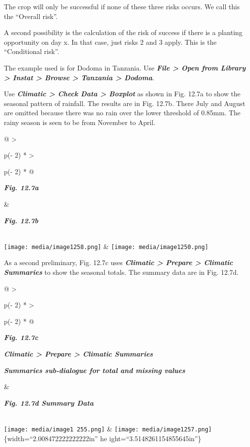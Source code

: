 \documentclass[
  letterpaper,
  DIV=11,
  numbers=noendperiod]{scrreprt}
\begin{document}
The crop will only be successful if none of these three risks occurs. We
call this the ``Overall risk''.

A second possibility is the calculation of the risk of success if there
is a planting opportunity on day x. In that case, just risks 2 and 3
apply. This is the ``Conditional risk''.

The example used is for Dodoma in Tanzania. Use \textbf{\emph{File
\textgreater{} Open from Library \textgreater{} Instat \textgreater{}
Browse \textgreater{} Tanzania \textgreater{} Dodoma}}.

Use \textbf{\emph{Climatic \textgreater{} Check Data \textgreater{}
Boxplot}} as shown in Fig. 12.7a to show the seasonal pattern of
rainfall. The results are in Fig. 12.7b. There July and August are
omitted because there was no rain over the lower threshold of 0.85mm.
The rainy season is seen to be from November to April.

\begin{longtable}[]{@{}
  >{\raggedright\arraybackslash}p{(\columnwidth - 2\tabcolsep) * }
  >{\raggedright\arraybackslash}p{(\columnwidth - 2\tabcolsep) * }@{}}
\toprule\noalign{}
\begin{minipage}[b]{\linewidth}\raggedright
\textbf{\emph{Fig. 12.7a}}
\end{minipage} & \begin{minipage}[b]{\linewidth}\raggedright
\textbf{\emph{Fig. 12.7b}}
\end{minipage} \\
\midrule\noalign{}
\endhead
\bottomrule\noalign{}
\endlastfoot
\texttt{[image: media/image1258.png]} &
\texttt{[image: media/image1250.png]} \\
\end{longtable}

As a second preliminary, Fig. 12.7c uses \textbf{\emph{Climatic
\textgreater{} Prepare \textgreater{} Climatic Summaries}} to show the
seasonal totals. The summary data are in Fig. 12.7d.

\begin{longtable}[]{@{}
  >{\raggedright\arraybackslash}p{(\columnwidth - 2\tabcolsep) * }
  >{\raggedright\arraybackslash}p{(\columnwidth - 2\tabcolsep) * }@{}}
\toprule\noalign{}
\begin{minipage}[b]{\linewidth}\raggedright
\textbf{\emph{Fig. 12.7c}}

\textbf{\emph{Climatic \textgreater{} Prepare \textgreater{} Climatic
Summaries}}

\textbf{\emph{Summaries sub-dialogue for total and missing values}}
\end{minipage} & \begin{minipage}[b]{\linewidth}\raggedright
\textbf{\emph{Fig. 12.7d Summary Data}}
\end{minipage} \\
\midrule\noalign{}
\endhead
\bottomrule\noalign{}
\endlastfoot
\texttt{[image: media/image1 255.png]}
& \texttt{[image: media/image1257.png]} \{width=``2.008472222222222in''
he ight=``3.5148261154855645in''\} \\
\end{longtable}
\end{document}
